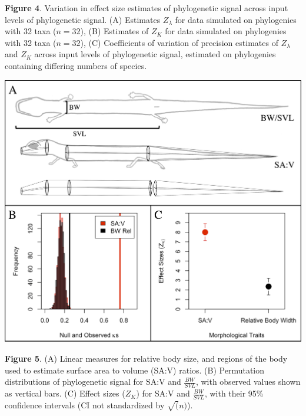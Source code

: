 \documentclass[
]{article}
\begin{document}
\singlespacing \textbf{Figure 4}. Variation in effect size estimates of
phylogenetic signal across input levels of phylogenetic signal. (A)
Estimates \(Z_\lambda\) for data simulated on phylogenies with 32 taxa
(\(n=32\)), (B) Estimates of \(Z_K\) for data simulated on phylogenies
with 32 taxa (\(n=32\)), (C) Coefficients of variation of precision
estimates of \(Z_\lambda\) and \(Z_K\) across input levels of
phylogenetic signal, estimated on phylogenies containing differing
numbers of species.

\includegraphics[width=0.95\linewidth]{Fig5}

\singlespacing \textbf{Figure 5}. (A) Linear measures for relative body
size, and regions of the body used to estimate surface area to volume
(SA:V) ratios. (B) Permutation distributions of phylogenetic signal for
SA:V and \(\frac{BW}{SVL}\), with observed values shown as vertical
bars. (C) Effect sizes (\(Z_K\)) for SA:V and \(\frac{BW}{SVL}\), with
their 95\% confidence intervals (CI not standardized by \(\sqrt(n)\)).
\end{document}

